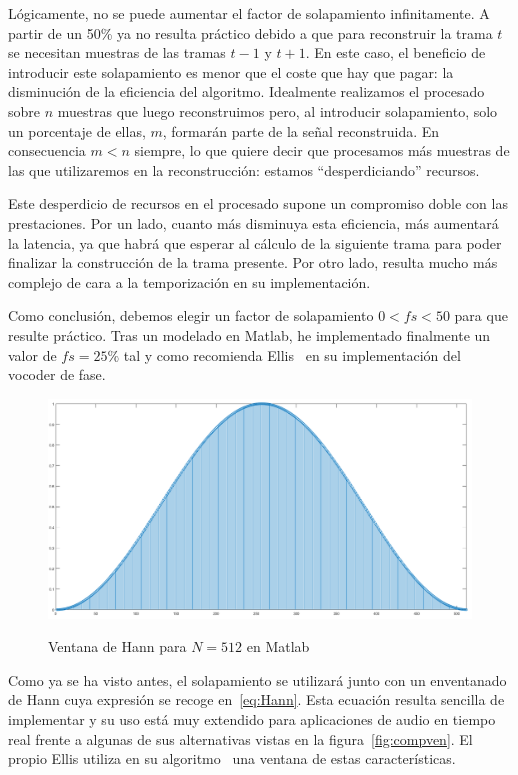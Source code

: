 Lógicamente, no se puede aumentar el factor de solapamiento infinitamente. A partir de un 50\% ya no resulta práctico debido a que para reconstruir la trama $t$ se necesitan muestras de las tramas $t-1$ y $t+1$. En este caso, el beneficio de introducir este solapamiento es menor que el coste que hay que pagar: la disminución de la eficiencia del algoritmo. Idealmente realizamos el procesado sobre $n$ muestras que luego reconstruimos pero, al introducir solapamiento, solo un porcentaje de ellas, $m$, formarán parte de la señal reconstruida. En consecuencia $m < n$ siempre, lo que quiere decir que procesamos más muestras de las que utilizaremos en la reconstrucción: estamos ``desperdiciando'' recursos.

Este desperdicio de recursos en el procesado supone un compromiso doble con las prestaciones. Por un lado, cuanto más disminuya esta eficiencia, más aumentará la latencia, ya que habrá que esperar al cálculo de la siguiente trama para poder finalizar la construcción de la trama presente. Por otro lado, resulta mucho más complejo de cara a la temporización en su implementación. 

Como conclusión, debemos elegir un factor de solapamiento $0 < fs < 50$ para que resulte práctico. Tras un modelado en Matlab, he implementado finalmente un valor de $fs = 25\%$ tal y como recomienda Ellis~\cite{Ellis} en su implementación del vocoder de fase.

\begin{figure}[!b]
\begin{center}
\label{fig:used_win}
\includegraphics[width=15cm]{img/ventana_utilizada.png}
\caption{Ventana de Hann para $N = 512$ en Matlab}
\end{center}
\end{figure}

Como ya se ha visto antes, el solapamiento se utilizará junto con un enventanado de Hann cuya expresión se recoge en~\ref{eq:Hann}. Esta ecuación resulta sencilla de implementar y su uso está muy extendido para aplicaciones de audio en tiempo real frente a algunas de sus alternativas vistas en la figura~\ref{fig:compven}. El propio Ellis utiliza en su algoritmo~\cite{Ellis} una ventana de estas características.

